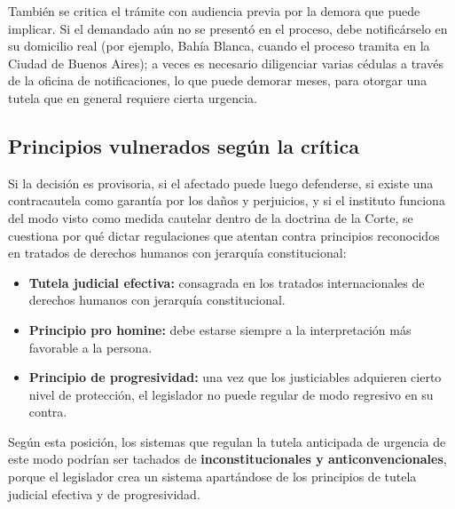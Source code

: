 \documentclass[12pt,oneside]{book}
\begin{document}
También se critica el trámite con audiencia previa por la demora que puede implicar. Si el demandado aún no se presentó en el proceso, debe notificárselo en su domicilio real (por ejemplo, Bahía Blanca, cuando el proceso tramita en la Ciudad de Buenos Aires); a veces es necesario diligenciar varias cédulas a través de la oficina de notificaciones, lo que puede demorar meses, para otorgar una tutela que en general requiere cierta urgencia.

\subsection{Principios vulnerados según la crítica}

Si la decisión es provisoria, si el afectado puede luego defenderse, si existe una contracautela como garantía por los daños y perjuicios, y si el instituto funciona del modo visto como medida cautelar dentro de la doctrina de la Corte, se cuestiona por qué dictar regulaciones que atentan contra principios reconocidos en tratados de derechos humanos con jerarquía constitucional:

\begin{itemize}
    \item \textbf{Tutela judicial efectiva:} consagrada en los tratados internacionales de derechos humanos con jerarquía constitucional.
    \item \textbf{Principio pro homine:} debe estarse siempre a la interpretación más favorable a la persona.
    \item \textbf{Principio de progresividad:} una vez que los justiciables adquieren cierto nivel de protección, el legislador no puede regular de modo regresivo en su contra.
\end{itemize}

Según esta posición, los sistemas que regulan la tutela anticipada de urgencia de este modo podrían ser tachados de \textbf{inconstitucionales y anticonvencionales}, porque el legislador crea un sistema apartándose de los principios de tutela judicial efectiva y de progresividad.
\end{document}

